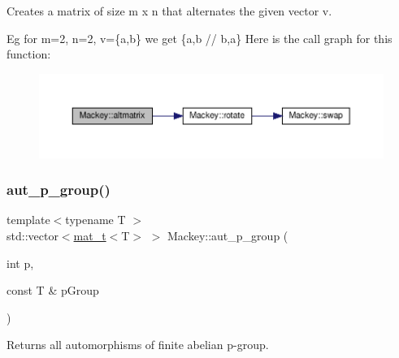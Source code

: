 Creates a matrix of size m x n that alternates the given vector v. 

Eg for m=2, n=2, v=\{a,b\} we get \{a,b // b,a\} Here is the call graph for this function\+:\nopagebreak
\begin{figure}[H]
\begin{center}
\leavevmode
\includegraphics[width=350pt]{namespaceMackey_a26a529f63caac9c5b4dc809e0e5831be_cgraph}
\end{center}
\end{figure}
\mbox{\label{namespaceMackey_a918f02198f6daadfd0c93109b63b2f1f}} 
\subsubsection{\texorpdfstring{aut\+\_\+p\+\_\+group()}{aut\_p\_group()}}
{\footnotesize\ttfamily template$<$typename T $>$ \\
std\+::vector$<$\hyperlink{namespaceMackey_a035386035757dade630f685e508e5cf9}{mat\+\_\+t}$<$T$>$ $>$ Mackey\+::aut\+\_\+p\+\_\+group (\begin{DoxyParamCaption}\item[{int}]{p,  }\item[{const T \&}]{p\+Group }\end{DoxyParamCaption})}



Returns all automorphisms of finite abelian p-\/group. 

